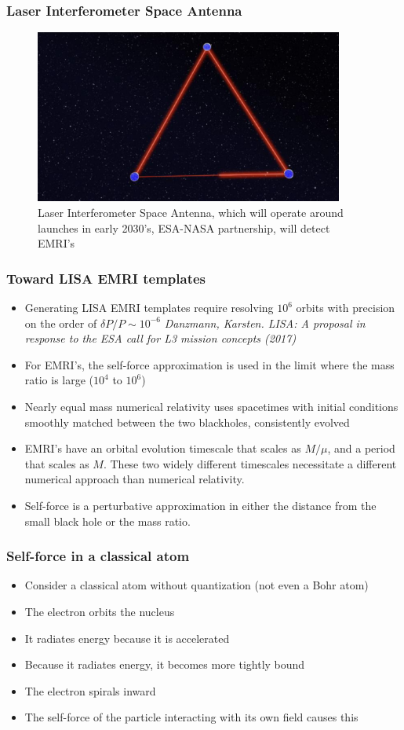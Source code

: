 \documentclass{beamer}
\begin{document}
\begin{frame}
  \frametitle{Laser Interferometer Space Antenna}
  \begin{figure}
    \includegraphics[width=4.0in]{eLISA}
    \caption{Laser Interferometer Space Antenna, which will operate around launches in early 2030's, ESA-NASA partnership, will detect EMRI's}
  \end{figure}
\end{frame}



\begin{frame}
  \frametitle{Toward LISA EMRI templates}
  \begin{itemize}
  \item Generating LISA EMRI templates require resolving $10^6$ orbits with precision on the order of $\delta P/P\sim 10^{-6}$ {\em Danzmann, Karsten. LISA: A proposal in response to the ESA call for L3 mission concepts (2017)}
  \item For EMRI's, the self-force approximation is used in the limit where the mass ratio is large ($10^4$ to $10^6$)
  \item Nearly equal mass numerical relativity uses spacetimes with initial conditions smoothly matched between the two blackholes, consistently evolved
  \item EMRI's have an orbital evolution timescale that scales as $M/\mu$, and a period that scales as $M$. These two widely different timescales necessitate a different numerical approach than numerical relativity.
  \item Self-force is a perturbative approximation in either the distance from the small black hole or the mass ratio. 
  \end{itemize}
\end{frame}

\begin{frame}
  \frametitle{Self-force in a classical atom}
  \begin{itemize}
  \item Consider a classical atom without quantization (not even a Bohr atom)
  \item The electron orbits the nucleus
  \item It radiates energy because it is accelerated
  \item Because it radiates energy, it becomes more tightly bound
  \item The electron spirals inward
  \item The self-force of the particle interacting with its own
      field causes this
  \end{itemize}
\end{frame}
\end{document}
